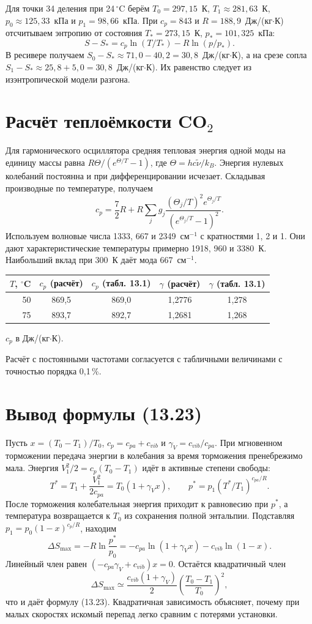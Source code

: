 \documentclass[12pt,a4paper]{article}
\begin{document}
Для точки 34 деления при 24\,$^\circ$C берём $T_0=297{,}15$~К,
$T_1\approx281{,}63$~К, $p_0\approx125{,}33$~кПа и $p_1=98{,}66$~кПа.
При $c_p=843$ и $R=188{,}9$~Дж/(кг$\cdot$К) отсчитываем энтропию
от состояния $T_*=273{,}15$~К, $p_*=101{,}325$~кПа:
\[
 S-S_*=c_p\ln(T/T_*)-R\ln(p/p_*).
\]
В ресивере получаем $S_0-S_*\approx71{,}0-40{,}2=30{,}8$~Дж/(кг$\cdot$К),
а на срезе сопла $S_1-S_*\approx25{,}8+5{,}0=30{,}8$~Дж/(кг$\cdot$К).
Их равенство следует из изэнтропической модели разгона.

\section{Расчёт теплоёмкости CO$_2$}

Для гармонического осциллятора средняя тепловая энергия одной моды
на единицу массы равна $R\Theta/(e^{\Theta/T}-1)$, где
$\Theta=hc\tilde\nu/k_B$. Энергия нулевых колебаний постоянна и при
дифференцировании исчезает. Складывая производные по температуре,
получаем
\[
 c_p=\frac72R + R\sum_j g_j
   \frac{(\Theta_j/T)^2 e^{\Theta_j/T}}{(e^{\Theta_j/T}-1)^2}.
\]
Используем волновые числа 1333, 667 и 2349~см$^{-1}$ с кратностями
1, 2 и 1. Они дают характеристические температуры примерно 1918,
960 и 3380~К. Наибольший вклад при 300~К даёт мода 667~см$^{-1}$.
\begin{center}
\begin{tabular}{rcccc}
\toprule
$T$, $^\circ$C & $c_p$ (расчёт) & $c_p$ (табл. 13.1) &
$\gamma$ (расчёт) & $\gamma$ (табл. 13.1) \\
\midrule
50 & 869,5 & 869,0 & 1,2776 & 1,278 \\
75 & 893,7 & 892,7 & 1,2681 & 1,268 \\
\bottomrule
\end{tabular}

\smallskip
$c_p$ в Дж/(кг$\cdot$К).
\end{center}
Расчёт с постоянными частотами согласуется с табличными величинами
с точностью порядка 0,1\,\%.

\section{Вывод формулы (13.23)}

Пусть $x=(T_0-T_1)/T_0$, $c_p=c_{pa}+c_{vib}$ и
$\gamma_V=c_{vib}/c_{pa}$. При мгновенном торможении передача энергии
в колебания за время торможения пренебрежимо мала. Энергия
$V_1^2/2=c_p(T_0-T_1)$ идёт в активные степени свободы:
\[
 T^*=T_1+\frac{V_1^2}{2c_{pa}}=T_0(1+\gamma_V x),\qquad
 p^*=p_1(T^*/T_1)^{c_{pa}/R}.
\]
После торможения колебательная энергия приходит к равновесию при
$p^*$, а температура возвращается к $T_0$ из сохранения полной
энтальпии. Подставляя $p_1=p_0(1-x)^{c_p/R}$, находим
\[
 \Delta S_{\max}=-R\ln\frac{p^*}{p_0}
   =-c_{pa}\ln(1+\gamma_V x)-c_{vib}\ln(1-x).
\]
Линейный член равен $(-c_{pa}\gamma_V+c_{vib})x=0$.
Остаётся квадратичный член
\[
 \Delta S_{\max}\simeq
 \frac{c_{vib}(1+\gamma_V)}{2}
 \left(\frac{T_0-T_1}{T_0}\right)^2,
\]
что и даёт формулу (13.23). Квадратичная зависимость объясняет,
почему при малых скоростях искомый перепад легко сравним с потерями
установки.
\end{document}
